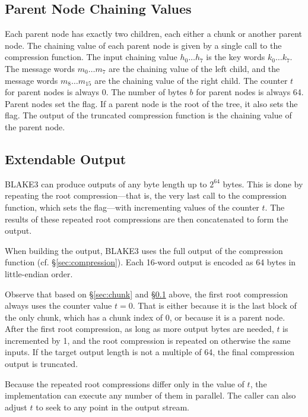 \documentclass[11pt,notitlepage,a4paper]{article}
\newcommand{\flag}[1]{\texttt{\detokenize{#1}}\xspace}
\begin{document}
\subsection{Parent Node Chaining Values}\label{sec:parent}

Each parent node has exactly two children, each either a chunk or another
parent node. The chaining value of each parent node is given by a single call
to the compression function. The input chaining value $h_{0} \ldots h_{7}$ is
the key words $k_{0} \ldots k_{7}$. The message words $m_{0} \ldots m_{7}$ are
the chaining value of the left child, and the message words $m_{8} \ldots
m_{15}$ are the chaining value of the right child. The counter $t$ for parent
nodes is always 0. The number of bytes $b$ for parent nodes is always 64.
Parent nodes set the \flag{PARENT} flag. If a parent node is the root of the
tree, it also sets the \flag{ROOT} flag. The output of the truncated
compression function is the chaining value of the parent node.

\subsection{Extendable Output}\label{sec:extendable}

BLAKE3 can produce outputs of any byte length up to $2^{64}$ bytes. 
This is done by repeating the root compression---that is, the very last 
call to the compression function, which sets the \flag{ROOT} flag---with 
incrementing values of the counter $t$. The results of these repeated root 
compressions are then concatenated to form the output.

When building the output, BLAKE3 uses the full output of the
compression function (cf. \S\ref{sec:compression}). Each 16-word output is
encoded as 64 bytes in little-endian order.

Observe that based on \S\ref{sec:chunk} and \S\ref{sec:parent} above, the first
root compression always uses the counter value $t = 0$. That is either because
it is the last block of the only chunk, which has a chunk index of $0$, or
because it is a parent node. After the first root compression, as long as more
output bytes are needed, $t$ is incremented by 1, and the root compression is
repeated on otherwise the same inputs. If the target output length is not a
multiple of 64, the final compression output is truncated.

Because the repeated root compressions differ only in the value of $t$, the
implementation can execute any number of them in parallel. The caller can also
adjust $t$ to seek to any point in the output stream.
\end{document}
